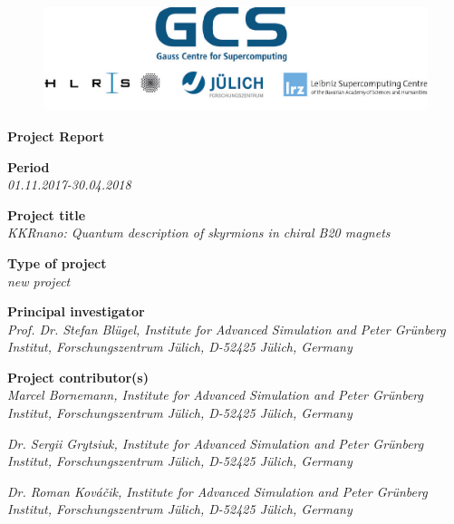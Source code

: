 \documentclass [a4paper, 12pt]{article}
\begin{document}
 
\begin{figure}[H]
\begin{center}
  \includegraphics[scale=0.45]{Figures/GCS-hlrs-fzj-lrz.jpg}\\
\end{center}
\end{figure}

\begin{center}
{\LARGE \bf Project Report} \\

\bigskip
\bigskip
\bigskip
\end{center}
\textbf{Period}\\
\phantom{MM}\textit{01.11.2017-30.04.2018}

\bigskip
\textbf{Project title}\\
\phantom{MM}\textit{KKRnano: Quantum description of skyrmions in chiral B20 magnets}

\bigskip
\textbf{Type of project}\\
\phantom{MM} \textit{new project}


\bigskip
\textbf{Principal investigator}\\
\phantom{MM} \textit{ Prof. Dr. Stefan Bl{\"u}gel,
Institute for Advanced Simulation and Peter Gr\"unberg Institut, Forschungszentrum J\"ulich, D-52425 J\"ulich, Germany
}

\bigskip
\textbf{Project contributor(s)}\\

\phantom{MM} \textit{Marcel Bornemann,
Institute for Advanced Simulation and Peter Gr\"unberg Institut, Forschungszentrum J\"ulich, D-52425 J\"ulich, Germany
}

\phantom{MM} \textit{Dr. Sergii Grytsiuk,
Institute for Advanced Simulation and Peter Gr\"unberg Institut, Forschungszentrum J\"ulich, D-52425 J\"ulich, Germany
}

\phantom{MM} \textit{Dr. Roman Kováčik,
Institute for Advanced Simulation and Peter Gr\"unberg Institut, Forschungszentrum J\"ulich, D-52425 J\"ulich, Germany
}
\end{document}
